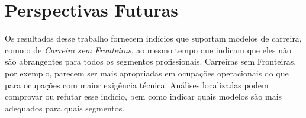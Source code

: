 \documentclass[
  article,
  11pt,
  a4paper,
  english,
  brazil,
  sumario=tradicional]{abntex2}
\begin{document}

\section{Perspectivas Futuras}

Os resultados desse trabalho fornecem indícios que suportam modelos de carreira, como o de \textit{Carreira sem Fronteiras}, ao mesmo tempo que indicam que eles não são abrangentes para todos os segmentos profissionais. Carreiras sem Fronteiras, por exemplo, parecem ser mais apropriadas em ocupações operacionais do que para ocupações com maior exigência técnica. Análises localizadas podem comprovar ou refutar esse indício, bem como indicar quais modelos são mais adequados para quais segmentos.
\end{document}

